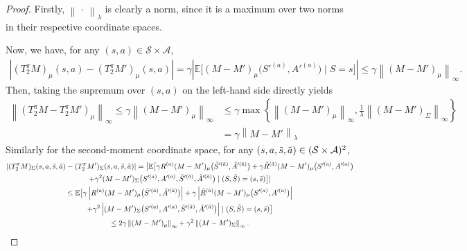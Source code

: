 \documentclass[accepted]{uai2026}
\theoremstyle{plain}
\theoremstyle{definition}
\theoremstyle{remark}
\newcommand{\A}{\mathcal{A}}
\newcommand{\E}{\mathbb{E}}
\newcommand{\Ss}{\mathcal{S}}
\newcommand{\Lvert}{\left\lvert}
\newcommand{\Rvert}{\right\rvert}
\newcommand{\LVert}{\left\lVert}
\newcommand{\RVert}{\right\rVert}
\newcommand{\1}{\mathbbm{1}}
\newcommand{\norm}[1]{\left\lVert #1\right\rVert}
\begin{document}
\begin{proof}
Firstly, $\norm{\, \cdot \,}_{\lambda}$ is clearly a norm, since it is a maximum over two norms in their respective coordinate spaces. 

Now, we have, for any $(s, a) \in \Ss \times \A$,
\begin{equation}
\begin{split}
\left\lvert (T^\pi_2M)_\mu(s, a) -(T^\pi_2 M')_\mu(s,a)\right\rvert = \gamma\left\lvert \E\big[(M-M')_\mu\big(S'^{(a)}, A'^{(a)}\big) \mid S = s\big]\right\rvert \le\gamma \LVert(M-M')_\mu\RVert_\infty.
\end{split}
\end{equation}
Then, taking the supremum over $(s,a)$ on the left-hand side directly yields
\begin{equation}\label{eq:contraction2first}
\begin{split}
\LVert (T^\pi_2M - T^\pi_2M')_\mu\RVert_\infty \le \gamma \LVert(M-M')_\mu\RVert_\infty &\le \gamma \max \left\{ \LVert (M-M')_\mu\RVert_\infty, \frac{1}{\lambda}\LVert (M-M')_\Sigma\RVert_\infty\right\} \\
&= \gamma \LVert M-M'\RVert_{\lambda}
\end{split}
\end{equation}
Similarly for the second-moment coordinate space, for any $(s, a, \Tilde{s}, \Tilde{a}) \in (\Ss \times \A)^2$,
\begin{equation}
\begin{gathered}
\Lvert(T^\pi_2 M)_\Sigma(s, a, \Tilde{s}, \Tilde{a}) - (T^\pi_2 M')_\Sigma(s, a, \Tilde{s}, \Tilde{a})\Rvert = \big\lvert \E \big[\gamma R^{(a)} (M-M')_\mu \big(\Tilde{S}'^{(\Tilde{a})}, \Tilde{A}'^{(\Tilde{a})}\big) + \gamma \Tilde{R}^{(\Tilde{a})}(M-M')_\mu\big(S'^{(a)}, A'^{(a)}\big) \\ + \gamma^2 (M-M')_\Sigma \big(S'^{(a)}, A'^{(a)}, \Tilde{S}'^{(\Tilde{a})}, \Tilde{A}'^{(\Tilde{a})}\big)\mid (S, \Tilde{S}) = (s, \Tilde{s}) \big]\rvert \\
\le  \E \big[\gamma \Lvert R^{(a)} (M-M')_\mu \big(\Tilde{S}'^{(\Tilde{a})}, \Tilde{A}'^{(\Tilde{a})}\big)\Rvert + \gamma \Lvert\Tilde{R}^{(\Tilde{a})}(M-M')_\mu\big(S'^{(a)}, A'^{(a)}\big)\Rvert \\ + \gamma^2 \Lvert (M-M')_\Sigma \big(S'^{(a)}, A'^{(a)}, \Tilde{S}'^{(\Tilde{a})}, \Tilde{A}'^{(\Tilde{a})}\big)\Rvert\mid (S, \Tilde{S}) = (s, \Tilde{s}) \big]  \\
\le 2\gamma \LVert (M-M')_\mu\RVert_\infty + \gamma^2 \LVert (M-M')_\Sigma \RVert_\infty.
\end{gathered}

\end{equation}
\end{proof}
\end{document}
